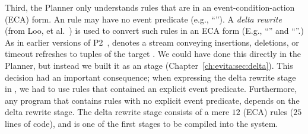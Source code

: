

Third, the Planner only understands rules that are in an event-condition-action
(ECA) form.  An \OVERLOG rule may have no event predicate (e.g., ``'').  A {\em delta rewrite} (from Loo, et
al.~\cite{loo-sigmod06}) is used to convert such rules in an ECA form (E.g.,
``'' and ``''.) As in earlier versions of P2~\cite{loo-sigmod06},
 denotes a stream conveying insertions, deletions, or timeout
refreshes to tuples of the target .  We could have done this directly
in the Planner, but instead we built it as an \OVERLOG stage
(Chapter~\ref{ch:evita:sec:delta}).  This decision had an important
consequence; when expressing the delta rewrite stage in \OVERLOG, we had to use
rules that contained an explicit event predicate.  Furthermore, any \OVERLOG
program that contains rules with no explicit event predicate, depends on the
delta rewrite stage.  The delta rewrite stage consists of a mere $12$ \OVERLOG
(ECA) rules ($25$ lines of code), and is one of the first \OVERLOG stages to be
compiled into the system.
 

